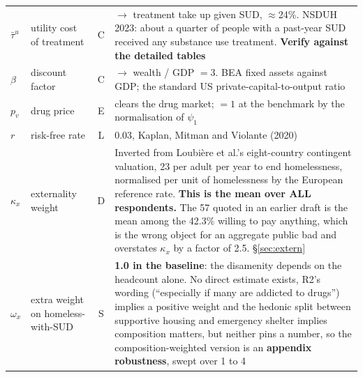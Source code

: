 \documentclass[11pt]{article}
\begin{document}
\begin{longtable}{lL{3.8cm}cL{5.8cm}}
$\bar\tau^{u}$ & utility cost of treatment & C & $\rightarrow$ treatment take up given SUD, $\approx$24\%. NSDUH 2023: about a quarter of people with a past-year SUD received any substance use treatment. \textbf{Verify against the detailed tables}\\
$\beta$ & discount factor & C & $\rightarrow$ wealth / GDP $=3$. BEA fixed assets against GDP; the standard US private-capital-to-output ratio\\
$p_v$ & drug price & E & clears the drug market; $=1$ at the benchmark by the normalisation of $\psi_1$\\
$r$ & risk-free rate & L & 0.03, Kaplan, Mitman and Violante (2020)\\
$\kappa_x$ & externality weight & D & Inverted from Loubi\`ere et al.'s eight-country contingent valuation, \EUR{}23 per adult per year to end homelessness, normalised per unit of homelessness by the European reference rate. \textbf{This is the mean over ALL respondents.} The \EUR{}57 quoted in an earlier draft is the mean among the 42.3\% willing to pay anything, which is the wrong object for an aggregate public bad and overstates $\kappa_x$ by a factor of 2.5. \S\ref{sec:extern}\\
$\omega_x$ & extra weight on homeless-with-SUD & S & \textbf{1.0 in the baseline}: the disamenity depends on the headcount alone. No direct estimate exists, R2's wording (``especially if many are addicted to drugs'') implies a positive weight and the hedonic split between supportive housing and emergency shelter implies composition matters, but neither pins a number, so the composition-weighted version is an \textbf{appendix robustness}, swept over 1 to 4\\
\bottomrule
\end{longtable}
\end{document}

